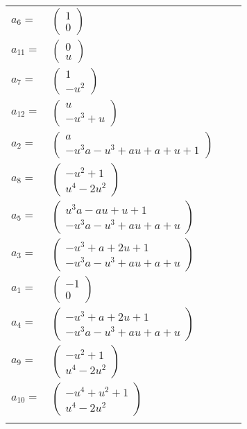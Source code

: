 \documentclass[1p]{elsarticle_modified}
\theoremstyle{definition}
\begin{document}
\begin{tabular}{m{7pt} m{180pt} m{7pt} m{180pt} }
\flushright $a_{6}=$&$\begin{pmatrix}1\\0\end{pmatrix}$ \\
\flushright $a_{11}=$&$\begin{pmatrix}0\\u\end{pmatrix}$ \\
\flushright $a_{7}=$&$\begin{pmatrix}1\\- u^2\end{pmatrix}$ \\
\flushright $a_{12}=$&$\begin{pmatrix}u\\- u^3+u\end{pmatrix}$ \\
\flushright $a_{2}=$&$\begin{pmatrix}a\\- u^3 a- u^3+a u+a+u+1\end{pmatrix}$ \\
\flushright $a_{8}=$&$\begin{pmatrix}- u^2+1\\u^4-2 u^2\end{pmatrix}$ \\
\flushright $a_{5}=$&$\begin{pmatrix}u^3 a- a u+u+1\\- u^3 a- u^3+a u+a+u\end{pmatrix}$ \\
\flushright $a_{3}=$&$\begin{pmatrix}- u^3+a+2 u+1\\- u^3 a- u^3+a u+a+u\end{pmatrix}$ \\
\flushright $a_{1}=$&$\begin{pmatrix}-1\\0\end{pmatrix}$ \\
\flushright $a_{4}=$&$\begin{pmatrix}- u^3+a+2 u+1\\- u^3 a- u^3+a u+a+u\end{pmatrix}$ \\
\flushright $a_{9}=$&$\begin{pmatrix}- u^2+1\\u^4-2 u^2\end{pmatrix}$ \\
\flushright $a_{10}=$&$\begin{pmatrix}- u^4+u^2+1\\u^4-2 u^2\end{pmatrix}$\\&\end{tabular}
\end{document}

